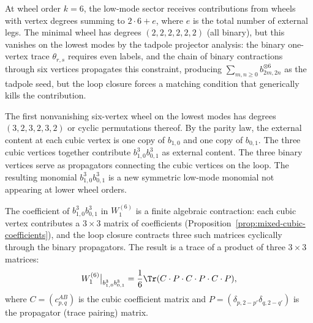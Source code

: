 \begin{computation}
At wheel order $k = 6$, the low-mode sector receives contributions from wheels
with vertex degrees summing to $2 \cdot 6 + e$, where $e$ is the total number of
external legs. The minimal wheel has degrees $(2,2,2,2,2,2)$ (all binary), but
this vanishes on the lowest modes by the tadpole projector analysis: the binary
one-vertex trace $\theta_{r,s}$ requires even labels, and the chain of binary
contractions through six vertices propagates this constraint, producing
$\sum_{m,n \geq 0} b_{2m,2n}^{\otimes 6}$ as the tadpole seed, but the loop closure
forces a matching condition that generically kills the contribution.

The first nonvanishing six-vertex wheel on the lowest modes has degrees
$(3,2,3,2,3,2)$ or cyclic permutations thereof. By the parity law, the external
content at each cubic vertex is one copy of $b_{1,0}$ and one copy of $b_{0,1}$.
The three cubic vertices together contribute $b_{1,0}^3 b_{0,1}^3$ as external content.
The three binary vertices serve as propagators connecting the cubic vertices on the
loop. The resulting monomial $b_{1,0}^3 b_{0,1}^3$ is a new symmetric low-mode
monomial not appearing at lower wheel orders.

The coefficient of $b_{1,0}^3 b_{0,1}^3$ in $W_1^{(6)}$ is a finite algebraic
contraction: each cubic vertex contributes a $3 \times 3$ matrix of coefficients
(Proposition~\ref{prop:mixed-cubic-coefficients}), and the loop closure contracts
three such matrices cyclically through the binary propagators. The result is a
trace of a product of three $3 \times 3$ matrices:
\begin{equation}
W_1^{(6)}\big|_{b_{1,0}^3 b_{0,1}^3}
= \frac{1}{6} \Tr(C \cdot P \cdot C \cdot P \cdot C \cdot P),
\end{equation}
where $C = (c^{AB}_{p,q})$ is the cubic coefficient matrix and
$P = (\delta_{p,2-p'}\delta_{q,2-q'})$ is the propagator (trace pairing) matrix.
\end{computation}

